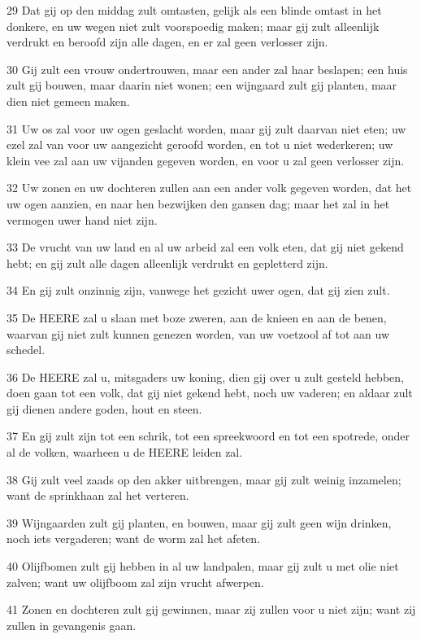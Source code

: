 \par 29 Dat gij op den middag zult omtasten, gelijk als een blinde omtast in het donkere, en uw wegen niet zult voorspoedig maken; maar gij zult alleenlijk verdrukt en beroofd zijn alle dagen, en er zal geen verlosser zijn.
\par 30 Gij zult een vrouw ondertrouwen, maar een ander zal haar beslapen; een huis zult gij bouwen, maar daarin niet wonen; een wijngaard zult gij planten, maar dien niet gemeen maken.
\par 31 Uw os zal voor uw ogen geslacht worden, maar gij zult daarvan niet eten; uw ezel zal van voor uw aangezicht geroofd worden, en tot u niet wederkeren; uw klein vee zal aan uw vijanden gegeven worden, en voor u zal geen verlosser zijn.
\par 32 Uw zonen en uw dochteren zullen aan een ander volk gegeven worden, dat het uw ogen aanzien, en naar hen bezwijken den gansen dag; maar het zal in het vermogen uwer hand niet zijn.
\par 33 De vrucht van uw land en al uw arbeid zal een volk eten, dat gij niet gekend hebt; en gij zult alle dagen alleenlijk verdrukt en gepletterd zijn.
\par 34 En gij zult onzinnig zijn, vanwege het gezicht uwer ogen, dat gij zien zult.
\par 35 De HEERE zal u slaan met boze zweren, aan de knieen en aan de benen, waarvan gij niet zult kunnen genezen worden, van uw voetzool af tot aan uw schedel.
\par 36 De HEERE zal u, mitsgaders uw koning, dien gij over u zult gesteld hebben, doen gaan tot een volk, dat gij niet gekend hebt, noch uw vaderen; en aldaar zult gij dienen andere goden, hout en steen.
\par 37 En gij zult zijn tot een schrik, tot een spreekwoord en tot een spotrede, onder al de volken, waarheen u de HEERE leiden zal.
\par 38 Gij zult veel zaads op den akker uitbrengen, maar gij zult weinig inzamelen; want de sprinkhaan zal het verteren.
\par 39 Wijngaarden zult gij planten, en bouwen, maar gij zult geen wijn drinken, noch iets vergaderen; want de worm zal het afeten.
\par 40 Olijfbomen zult gij hebben in al uw landpalen, maar gij zult u met olie niet zalven; want uw olijfboom zal zijn vrucht afwerpen.
\par 41 Zonen en dochteren zult gij gewinnen, maar zij zullen voor u niet zijn; want zij zullen in gevangenis gaan.
